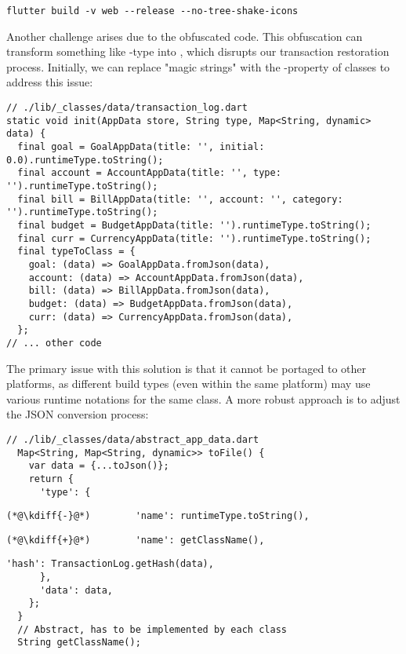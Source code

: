 \begin{lstlisting}[language=terminal]
flutter build -v web --release --no-tree-shake-icons
\end{lstlisting}

\noindent Another challenge arises due to the obfuscated code. This obfuscation can transform something like 
-type into , which disrupts our transaction restoration process. Initially, we can 
replace "magic strings" with the -property of classes to address this issue:

\begin{lstlisting}
// ./lib/_classes/data/transaction_log.dart
static void init(AppData store, String type, Map<String, dynamic> data) {
  final goal = GoalAppData(title: '', initial: 0.0).runtimeType.toString();
  final account = AccountAppData(title: '', type: '').runtimeType.toString();
  final bill = BillAppData(title: '', account: '', category: '').runtimeType.toString();
  final budget = BudgetAppData(title: '').runtimeType.toString();
  final curr = CurrencyAppData(title: '').runtimeType.toString();
  final typeToClass = {
    goal: (data) => GoalAppData.fromJson(data),
    account: (data) => AccountAppData.fromJson(data),
    bill: (data) => BillAppData.fromJson(data),
    budget: (data) => BudgetAppData.fromJson(data),
    curr: (data) => CurrencyAppData.fromJson(data),
  };
// ... other code
\end{lstlisting}

\noindent The primary issue with this solution is that it cannot be portaged to other platforms, as different build 
types (even within the same platform) may use various runtime notations for the same class. A more robust approach is 
to adjust the JSON conversion process:

\begin{lstlisting}
// ./lib/_classes/data/abstract_app_data.dart
  Map<String, Map<String, dynamic>> toFile() {
    var data = {...toJson()};
    return {
      'type': {
\end{lstlisting}
{
\xpretocmd{\lstlisting}{\vspace{-12pt}}{}{}
\begin{lstlisting}[firstnumber=6, backgroundcolor=\color{backred}]
(*@\kdiff{-}@*)        'name': runtimeType.toString(),
\end{lstlisting}
\begin{lstlisting}[firstnumber=6, backgroundcolor=\color{backgreen}]
(*@\kdiff{+}@*)        'name': getClassName(),
\end{lstlisting}
\begin{lstlisting}[firstnumber=7]
        'hash': TransactionLog.getHash(data),
      },
      'data': data,
    };
  }
  // Abstract, has to be implemented by each class
  String getClassName();
\end{lstlisting}
}

